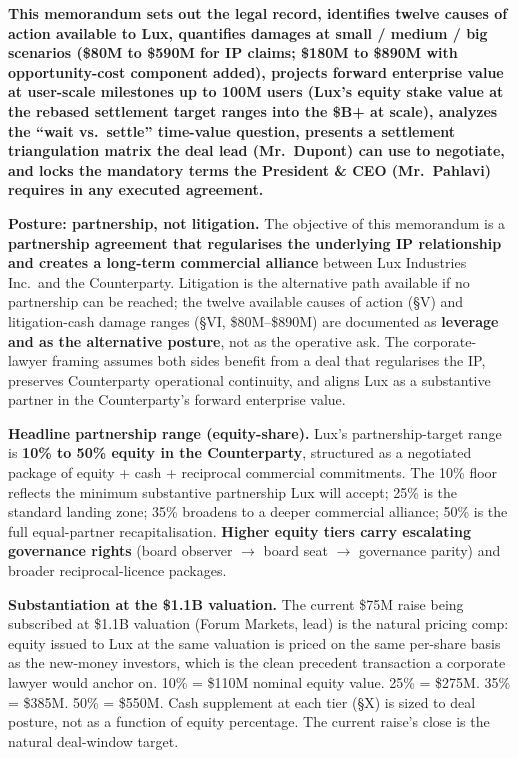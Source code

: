 \documentclass[11pt,letterpaper]{article}
\begin{document}
\textbf{This memorandum sets out the legal record, identifies twelve
causes of action available to Lux, quantifies damages at small /
medium / big scenarios (\$80M to \$590M for IP claims; \$180M to
\$890M with opportunity-cost component added), projects forward
enterprise value at user-scale milestones up to 100M users (Lux's
equity stake value at the rebased settlement target ranges into the
\$B+ at scale), analyzes the ``wait vs.\ settle'' time-value question,
presents a settlement triangulation matrix the deal lead (Mr.\ Dupont)
can use to negotiate, and locks the mandatory terms the President \&
CEO (Mr.\ Pahlavi) requires in any executed agreement.}

\textbf{Posture: partnership, not litigation.} The objective of this
memorandum is a \textbf{partnership agreement that regularises the
underlying IP relationship and creates a long-term commercial
alliance} between Lux Industries Inc.\ and the Counterparty.
Litigation is the alternative path available if no partnership can
be reached; the twelve available causes of action (\S V) and
litigation-cash damage ranges (\S VI, \$80M--\$890M) are documented
as \textbf{leverage and as the alternative posture}, not as the
operative ask. The corporate-lawyer framing assumes both sides
benefit from a deal that regularises the IP, preserves Counterparty
operational continuity, and aligns Lux as a substantive partner in
the Counterparty's forward enterprise value.

\textbf{Headline partnership range (equity-share).} Lux's
partnership-target range is \textbf{10\% to 50\% equity in the
Counterparty}, structured as a negotiated package of equity + cash
+ reciprocal commercial commitments. The 10\% floor reflects the
minimum substantive partnership Lux will accept; 25\% is the standard
landing zone; 35\% broadens to a deeper commercial alliance; 50\% is
the full equal-partner recapitalisation. \textbf{Higher equity tiers
carry escalating governance rights} (board observer $\to$ board seat
$\to$ governance parity) and broader reciprocal-licence packages.

\textbf{Substantiation at the \$1.1B valuation.} The current \$75M
raise being subscribed at \$1.1B valuation (Forum Markets, lead) is
the natural pricing comp: equity issued to Lux at the same valuation
is priced on the same per-share basis as the new-money investors,
which is the clean precedent transaction a corporate lawyer would
anchor on. 10\% = \$110M nominal equity value. 25\% = \$275M. 35\% =
\$385M. 50\% = \$550M. Cash supplement at each tier (\S X) is sized
to deal posture, not as a function of equity percentage. The current
raise's close is the natural deal-window target.
\end{document}
